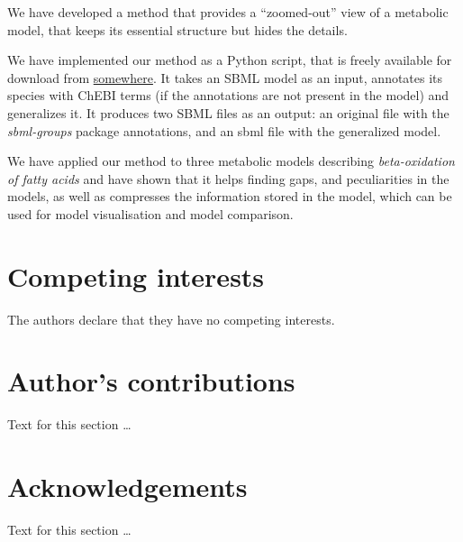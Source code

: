 \documentclass[10pt]{bmc_article}
\newenvironment{bmcformat}{\baselineskip20pt\sloppy\setboolean{publ}{false}}{\baselineskip20pt\sloppy}
\begin{document}
\begin{bmcformat}
We have developed a method that provides a ``zoomed-out'' view of a metabolic model, that keeps its essential structure but hides the details. 

We have implemented our method as a Python script, that is freely available for download from \url{somewhere}. It takes an SBML model as an input, annotates its species with ChEBI terms (if the annotations are not present in the model) and generalizes it. It produces two SBML files as an output: an original file with the \emph{sbml-groups} package annotations, and an sbml file with the generalized model.

We have applied our method to three metabolic models describing \emph{beta-oxidation of fatty acids} and have shown that it helps finding gaps, and peculiarities in the models, as well as compresses the information stored in the model, which can be used for model visualisation and model comparison.

%
%
%		
%			
%

\bigskip

\section*{Competing interests}
The authors declare that they have no competing interests.

\section*{Author's contributions}
    Text for this section \ldots    

\section*{Acknowledgements}
  Text for this section \ldots
 

\end{bmcformat}
\end{document}
